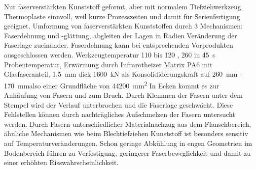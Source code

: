 Nur faserverstärkten Kunststoff geformt, aber mit normalem Tiefziehwerkzeug.
Thermoplaste sinnvoll, weil kurze Prozesszeiten und damit für Serienfertigung geeignet.
Umformung von faserverstärkten Kunststoffen durch 3 Mechanismen: Faserdehnung und -glättung, abgleiten der Lagen in Radien Veränderung der Faserlage zueinander.
Faserdehnung kann bei entsprechenden Vorprodukten ausgeschlossen werden.
Werkzeugtemperatur \SI{110}{\dC} bis \SI{120}{\dC} , \SI{260}{\dC} in \SI{45}{\second} Probentemperatur, Erwärmung durch Infrarotheizer
Matrix PA6 mit Glasfaseranteil, \SI{1.5}{\mm} dick
\SI{1600}{\kN} als Konsolididerungskraft auf \SI{260}{\mm} $\cdot$ \SI{170}{\mm}also einer Grundfläche von \SI{44200}{\mm\squared}
In Ecken kommt es zur Anhäufung von Fasern und zum Bruch.
Durch Klemmen der Fasern unter dem Stempel wird der Verlauf unterbrochen und die Faserlage geschwächt.
Diese Fehlstellen können durch nachträgliches Aufschmelzen der Fasern untersucht werden.
Durch Fasern unterschiedlicher Materialnachzug aus dem Flanschbereich, ähnliche Mechanismen wie beim Blechtiefziehen
Kunststoff ist besonders sensitiv auf Temperaturveränderungen.
Schon geringe Abkühlung in engen Geometrien im Bodenbereich führen zu Verfestigung, geringerer Faserbeweglichkeit und damit zu einer erhöhten Risswahrscheinlichkeit.
\cite{Behrens2017}

